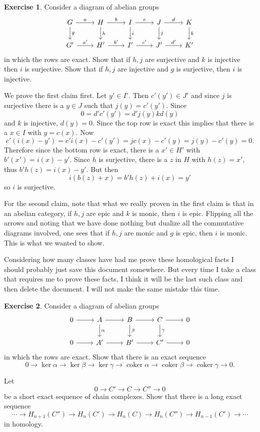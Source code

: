 \documentclass[10pt]{article}
\newcommand{\coker}{\operatorname{coker}}
\theoremstyle{definition}
\newtheorem{exer}{Exercise}
\begin{document}
\begin{exer}
Consider a diagram of abelian groups
$$\begin{tikzcd}
G \arrow[r,"a"] \arrow[d,"g"] & H \arrow[r,"b"] \arrow[d,"h"] & I \arrow[r,"c"] \arrow[d,"i"] & J \arrow[r,"d"] \arrow[d,"j"] & K \arrow[d,"k"]\\
G' \arrow[r,"a'"] & H' \arrow[r,"b'"] & I' \arrow[r,"c'"] & J' \arrow[r,"d'"] & K'
\end{tikzcd}$$
in which the rows are exact. Show that if $h,j$ are surjective and $k$ is injective then $i$ is surjective.
Show that if $h,j$ are injective and $g$ is surjective, then $i$ is injective.
\end{exer}

We prove the first claim first.
Let $y' \in I'$. Then $c'(y') \in J'$ and since $j$ is surjective there is a $y \in J$ such that $j(y) = c'(y')$.
Since
$$0 = d'c'(y') = d'j(y) kd(y)$$
and $k$ is injective, $d(y) = 0$.
Since the top row is exact this implies that there is a $x \in I$ with $y = c(x)$.
Now
$$c'(i(x) - y') = c'i(x) - c'(y') = jc(x) - c'(y) = j(y) - c'(y) = 0.$$
Therefore since the bottom row is exact, there is a $x' \in H'$ with $b'(x') = i(x) - y'$.
Since $h$ is surjective, there is a $z$ in $H$ with $h(z) = x'$, thus $b'h(z) = i(x) - y'$.
But then
$$i(b(z) + x) = b'h(z) + i(x) = y'$$
so $i$ is surjective.

For the second claim, note that what we really proven in the first claim is that in an abelian category, if $h,j$ are epic and $k$ is monic, then $i$ is epic.
Flipping all the arrows and noting that we have done nothing but dualize all the commutative diagrams involved, one sees that if $h,j$ are monic and $g$ is epic, then $i$ is monic.
This is what we wanted to show.

Considering how many classes have had me prove these homological facts I should probably just save this document somewhere.
But every time I take a class that requires me to prove these facts, I think it will be the last such class and then delete the document.
I will not make the same mistake this time.

\begin{exer}
Consider a diagram of abelian groups
$$\begin{tikzcd}
0 \arrow[r] & A \arrow[r] \arrow[d,"\alpha"] & B \arrow[r] \arrow[d,"\beta"] & C \arrow[r] \arrow[d,"\gamma"] & 0\\
0 \arrow[r] & A' \arrow[r] & B' \arrow[r] & C' \arrow[r] & 0
\end{tikzcd}$$
in which the rows are exact. Show that there is an exact sequence
$$0 \to \ker \alpha \to \ker \beta \to \ker \gamma \to \coker \alpha \to \coker \beta \to \coker \gamma \to 0.$$

Let
$$0 \to C' \to C \to C'' \to 0$$
be a short exact sequence of chain complexes. Show that there is a long exact sequence
$$\cdots \to H_{n+1}(C'') \to H_n(C') \to H_n(C) \to H_n(C'') \to H_{n-1}(C') \to \cdots$$
in homology.
\end{exer}
\end{document}
